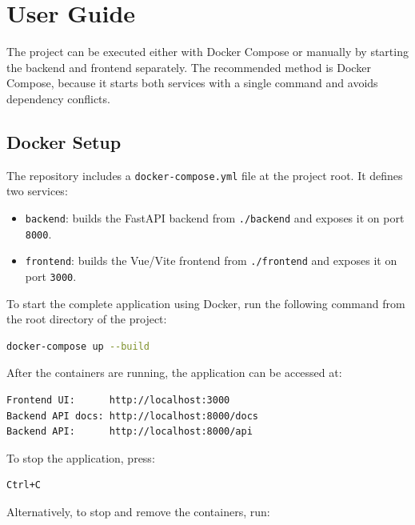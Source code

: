 \section{User Guide} \label{sec:user-guide}

The project can be executed either with Docker Compose or manually by starting the backend and frontend separately.
The recommended method is Docker Compose, because it starts both services with a single command and avoids dependency conflicts.

\subsection{Docker Setup} \label{subsec:docker-setup}

The repository includes a \texttt{docker-compose.yml} file at the project root.
It defines two services:

\begin{itemize}
    \item \texttt{backend}: builds the FastAPI backend from \texttt{./backend} and exposes it on port \texttt{8000}.
    \item \texttt{frontend}: builds the Vue/Vite frontend from \texttt{./frontend} and exposes it on port \texttt{3000}.
\end{itemize}

\noindent To start the complete application using Docker, run the following command from the root directory of the project:

\begin{lstlisting}[language=bash,label={lst:start-docker}]
docker-compose up --build
\end{lstlisting}

\noindent After the containers are running, the application can be accessed at:

\begin{lstlisting}[language=bash, label={lst:endpoint-link}]
Frontend UI:      http://localhost:3000
Backend API docs: http://localhost:8000/docs
Backend API:      http://localhost:8000/api
\end{lstlisting}

\noindent To stop the application, press:

\begin{lstlisting}[language=bash, label={lst:stop-application}]
Ctrl+C
\end{lstlisting}

\noindent Alternatively, to stop and remove the containers, run:

